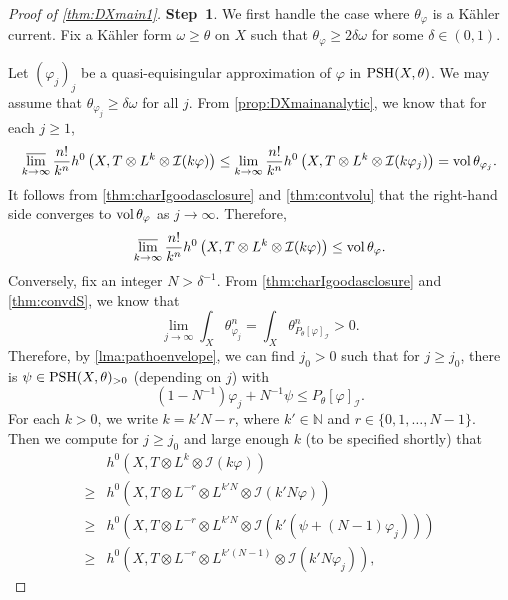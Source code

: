 \begin{proof}[Proof of \cref{thm:DXmain1}]
    \textbf{Step~1}. We first handle the case where $\theta_{\varphi}$ is a Kähler current. Fix a Kähler form $\omega\geq \theta$ on $X$ such that $\theta_{\varphi}\geq 2\delta\omega$ for some $\delta\in (0,1)$.

    Let $(\varphi_j)_j$ be a quasi-equisingular approximation of $\varphi$ in $\mathrm{PSH}(X,\theta)$.
    We may assume that $\theta_{\varphi_j}\geq \delta\omega$ for all $j$.
    From \cref{prop:DXmainanalytic}, we know that for each $j\geq 1$,
    \[
        \varlimsup_{k\to\infty}\frac{n!}{k^n}h^0\left(X,T\otimes L^k\otimes  \mathcal{I}(k\varphi)\right)\leq   \lim_{k\to\infty}\frac{n!}{k^n}h^0\left(X,T\otimes L^k\otimes  \mathcal{I}(k\varphi_j)\right)=\operatorname{vol} \theta_{\varphi_j}.
    \]
    It follows from \cref{thm:charIgoodasclosure} and \cref{thm:contvolu} that the right-hand side converges to $\operatorname{vol} \theta_{\varphi}$ as $j\to\infty$. Therefore,
    \[
        \varlimsup_{k\to\infty}\frac{n!}{k^n}h^0\left(X,T\otimes L^k\otimes  \mathcal{I}(k\varphi)\right)\leq \operatorname{vol} \theta_{\varphi}.
    \]
    Conversely, fix an integer $N>\delta^{-1}$.
    From \cref{thm:charIgoodasclosure} and \cref{thm:convdS}, we know that
    \begin{equation}\label{eq:quasiequmassconvtemp1}
        \lim_{j\to\infty}\int_X \theta_{\varphi_j}^n=\int_X \theta_{P_{\theta}[\varphi]_{\mathcal{I}}}^n>0.
    \end{equation}
    Therefore, by \cref{lma:pathoenvelope}, we can find $j_0>0$ such that for $j\geq j_0$, there is $\psi\in \mathrm{PSH}(X,\theta)_{>0}$ (depending on $j$) with
    \begin{equation}\label{eq:linearlowerbdPItemp1}
        (1-N^{-1})\varphi_j+N^{-1}\psi \leq P_{\theta}[\varphi]_{\mathcal{I}}.
    \end{equation}
    For each $k>0$, we write $k=k'N-r$, where $k'\in \mathbb{N}$ and $r\in \{0,1,\ldots,N-1\}$.
    Then we compute for $j\geq j_0$ and large enough $k$ (to be specified shortly) that
    \[
        \begin{aligned}
            & h^0\left(X,T\otimes L^{k}\otimes \mathcal{I}(k\varphi)\right)\\
            \geq & h^0\left(X,T\otimes L^{-r}\otimes L^{k'N}\otimes \mathcal{I}(k'N\varphi)\right)\\
            \geq & h^0\left(X,T\otimes L^{-r}\otimes L^{k'N}\otimes \mathcal{I}\left(k'(\psi+(N-1)\varphi_j)\right)\right)\\
            \geq & h^0\left(X,T\otimes L^{-r}\otimes L^{k'(N-1)}\otimes \mathcal{I}\left(k'N\varphi_j\right)\right),

\end{aligned}\]
\end{proof}
